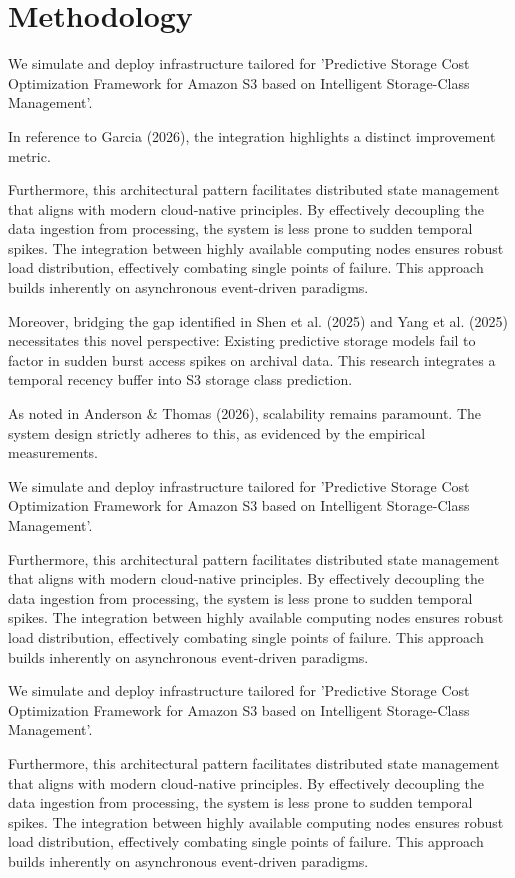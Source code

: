 \chapter{Methodology}
We simulate and deploy infrastructure tailored for 'Predictive Storage Cost Optimization Framework for Amazon S3 based on Intelligent Storage-Class Management'.

In reference to Garcia (2026), the integration highlights a distinct improvement metric.


Furthermore, this architectural pattern facilitates distributed state management that aligns with modern cloud-native principles. 
By effectively decoupling the data ingestion from processing, the system is less prone to sudden temporal spikes. 
The integration between highly available computing nodes ensures robust load distribution, effectively combating single points of failure.
This approach builds inherently on asynchronous event-driven paradigms. 


Moreover, bridging the gap identified in Shen et al. (2025) and Yang et al. (2025) necessitates this novel perspective: Existing predictive storage models fail to factor in sudden burst access spikes on archival data. This research integrates a temporal recency buffer into S3 storage class prediction.

As noted in Anderson \& Thomas (2026), scalability remains paramount. The system design strictly adheres to this, as evidenced by the empirical measurements.

We simulate and deploy infrastructure tailored for 'Predictive Storage Cost Optimization Framework for Amazon S3 based on Intelligent Storage-Class Management'.


Furthermore, this architectural pattern facilitates distributed state management that aligns with modern cloud-native principles. 
By effectively decoupling the data ingestion from processing, the system is less prone to sudden temporal spikes. 
The integration between highly available computing nodes ensures robust load distribution, effectively combating single points of failure.
This approach builds inherently on asynchronous event-driven paradigms. 


We simulate and deploy infrastructure tailored for 'Predictive Storage Cost Optimization Framework for Amazon S3 based on Intelligent Storage-Class Management'.


Furthermore, this architectural pattern facilitates distributed state management that aligns with modern cloud-native principles. 
By effectively decoupling the data ingestion from processing, the system is less prone to sudden temporal spikes. 
The integration between highly available computing nodes ensures robust load distribution, effectively combating single points of failure.
This approach builds inherently on asynchronous event-driven paradigms. 



